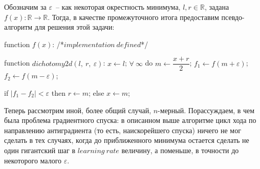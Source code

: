 \documentclass[12pt, a4paper, oneside, final]{article}
\begin{document}
	Обозначим за $\varepsilon$~-- как некоторая окрестность минимума, $l, r \in \mathbb{R}$, задана $f(x) : \mathbb{R} \to \mathbb{R}$. Тогда, в качестве промежуточного итога предоставим псевдо-алгоритм для решения этой задачи:
	\begin{pseudocode}
function $f(x)$:
	/*$implementation~defined$*/

function $dichotomy2d(l, ~ r, ~ \varepsilon)$:
	$x \gets l$;
	$\forall~\infty$ do
		$m \gets \dfrac{x + r}{2}$;
		$f_{1} \gets f(m + \varepsilon)$;
		$f_{2} \gets f(m - \varepsilon)$;

		if $|f_{1} - f_{2}| < \varepsilon$ then
			$r \gets m$;
		else
			$x \gets m$;
	\end{pseudocode}
	Теперь рассмотрим иной, более общий случай, $n$-мерный. Порассуждаем, в чем была проблема градиентного спуска: в описанном выше алгоритме цикл хода по направлению антиградиента (то есть, наискорейшего спуска) ничего не мог сделать в тех случаях, когда до приближенного минимума остается сделать не один гигантский шаг в $learning~rate$ величину, а поменьше, в точности до некоторого малого $\varepsilon$.
\end{document}
